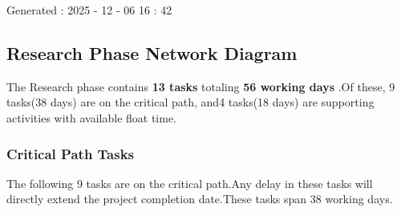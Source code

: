         Generated : 2025 -
    12 -
    06 16 : 42 %

\subsection{Research Phase Network Diagram}

                 The Research phase contains \textbf{13 tasks} totaling \textbf{
                     56 working days}
                     .Of these,
    9 tasks(38 days) are on the critical path,
    and4 tasks(18 days) are supporting activities with available float time.

\vspace {
  0.5em
}

\subsubsection { Critical Path Tasks }

\noindent The following 9 tasks are on the critical
    path.Any delay in these tasks will directly extend the project completion
        date.These tasks span 38 working days.

\vspace {
  0.5em
}

